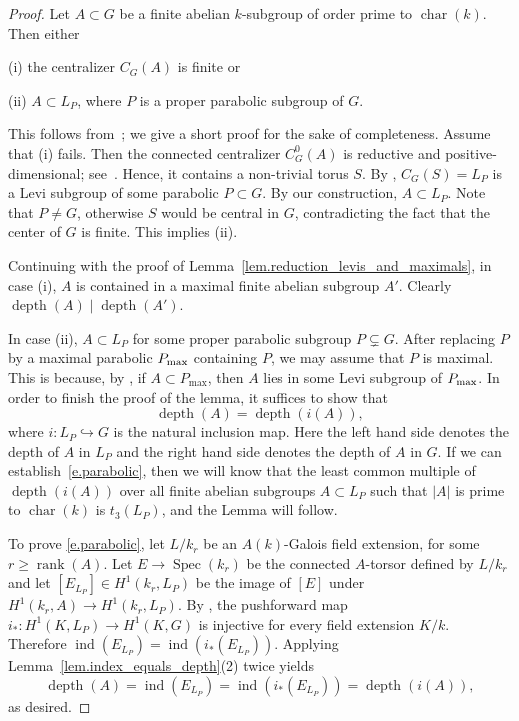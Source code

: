 \documentclass[12pt]{amsart}
\numberwithin{equation}{section}
\theoremstyle{remark}
\newcommand{\ind}{\operatorname{ind}}
\newcommand{\Spec}{\operatorname{Spec}}
\newcommand{\rank}{\operatorname{rank}}
\newcommand{\Char}{\operatorname{char}}
\newcommand{\depth}{\operatorname{depth}}
\begin{document}
\begin{proof}  
 Let $A\subset G$ be a finite abelian $k$-subgroup of order prime to $\Char(k)$. Then either

    \smallskip
    (i) the centralizer $C_G(A)$ is finite or

    \smallskip
    (ii) $A \subset L_P$, where $P$ is a proper parabolic subgroup of $G$.

\smallskip
\noindent
This follows from~\cite[Lemma 7.6]{reichstein-youssin}; we give
a short proof for the sake of completeness. Assume that (i) fails. 
Then the connected centralizer
$C^0_G(A)$ is reductive and positive-dimensional; see~\cite[Corollary 2.18(a)]{steinberg-torsion}.
Hence, it contains a non-trivial torus $S$.  By \cite[Proposition 20.4]{borel_lag}, $C_G(S) = L_P$ is a Levi subgroup of some parabolic $P \subset G$. By our construction, $A \subset L_P$. Note that $P \neq G$, otherwise $S$ would be central in $G$, contradicting the fact that the center of $G$ is finite. This implies (ii).

Continuing with the proof of Lemma~\ref{lem.reduction_levis_and_maximals},
in case (i), $A$ is contained in a maximal finite abelian subgroup
$A'$. Clearly $\depth(A) \mid \depth(A')$. 

In case (ii), $A \subset L_P$ for some proper parabolic subgroup $P \subsetneq G$. After replacing $P$ by a maximal parabolic $P_{\rm max}$ containing $P$, we may assume that $P$ is maximal. This is because, by \cite[Lemma 2.6]{bate2005geometric}, if $A \subset P_{\max}$, then $A$ lies in some Levi subgroup of $P_{\rm max}$. 
In order to finish the proof of the lemma, it suffices to show that  
\begin{equation} \label{e.parabolic}
\depth(A) = \depth(i(A)), \end{equation}
where $i\colon L_P\hookrightarrow G$ is the natural inclusion map. Here the left hand side denotes the depth of $A$ in $L_P$ and the right hand side denotes the depth of $A$ in $G$. 
If we can establish~\eqref{e.parabolic}, then we will know that the least common multiple of $\depth(i(A))$ over all finite abelian subgroups $A \subset L_P$ such that $|A|$ is prime to $\Char(k)$ is $t_3(L_P)$, and the Lemma will follow.

To prove \eqref{e.parabolic}, let $L/k_r$ be an $A(k)$-Galois field extension, for some $r\geqslant \rank(A)$. Let $E \to \Spec(k_r)$ be the connected $A$-torsor defined by $L/k_r$ and let $[E_{L_P}]\in H^1(k_r,L_{P})$ be the image of $[E]$ under $H^1(k_r,A)\to H^1(k_r,L_P)$. By \cite[Exposé XXVI, Corollaire 5.10(i)]{SGA3}, the pushforward map $i_*\colon H^1(K,L_P) \to H^1(K,G)$ is injective for every field extension $K/k$. 
Therefore $\ind(E_{L_P}) = \ind(i_*(E_{L_P}))$. Applying Lemma~\ref{lem.index_equals_depth}(2) twice yields
    $$\depth(A) = \ind(E_{L_P}) = \ind(i_*(E_{L_P}))= \depth(i(A)),$$
as desired.    
\end{proof}
\end{document}
